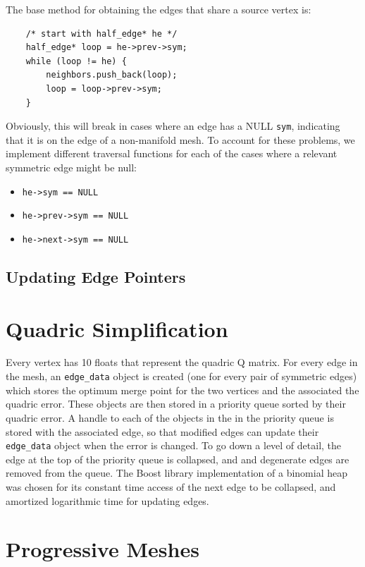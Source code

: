 \documentclass[11pt]{article}
\begin{document}
The base method for obtaining the edges that share a source vertex is:

\begin{verbatim}
    /* start with half_edge* he */
    half_edge* loop = he->prev->sym;
    while (loop != he) {
        neighbors.push_back(loop);
        loop = loop->prev->sym;
    }
\end{verbatim}

Obviously, this will break in cases where an edge has a NULL \verb`sym`,
indicating that it is on the edge of a non-manifold mesh. To account for these
problems, we implement different traversal functions for each of the cases where a
relevant symmetric edge might be null:

\begin{itemize}
    \item \verb`he->sym == NULL`
    \item \verb`he->prev->sym == NULL`
    \item \verb`he->next->sym == NULL`
\end{itemize}

\subsection{Updating Edge Pointers}

\section{Quadric Simplification}

Every vertex has 10 floats that represent the quadric Q matrix. For every edge
in the mesh, an \verb`edge_data` object is created (one for every pair of
symmetric edges) which stores the optimum merge point for the two vertices and
the associated the quadric error. These objects are then stored in a priority
queue sorted by their quadric error. A handle to each of the objects in the in
the priority queue is stored with the associated edge, so that modified edges
can update their \verb`edge_data` object when the error is changed. To go down
a level of detail, the edge at the top of the priority queue is collapsed, and
and degenerate edges are removed from the queue. The Boost library
implementation of a binomial heap was chosen for its constant time access of
the next edge to be collapsed, and amortized logarithmic time for updating
edges.

\section{Progressive Meshes}
\end{document}

